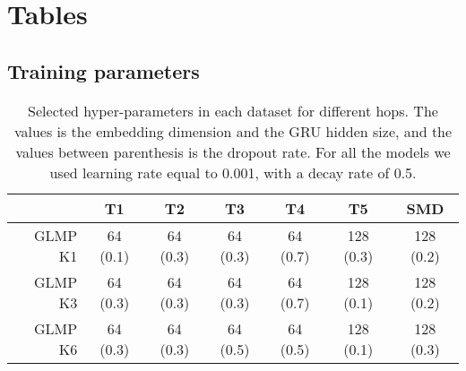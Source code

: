 \documentclass{article} \usepackage{iclr2019_conference,times}
\begin{document}



\newpage
\appendix
\section{Tables}

\subsection{Training parameters}

\begin{table}[h]
\centering
\setlength{\belowcaptionskip}{5pt} 
\caption{Selected hyper-parameters in each dataset for different hops. The values is the embedding dimension and the GRU hidden size, and the values between parenthesis is the dropout rate. For all the models we used learning rate equal to 0.001, with a decay rate of 0.5. }
\begin{tabular}{|r|c|c|c|c|c|c|}
\hline
\multicolumn{1}{|l|}{} & T1 & T2 & T3 & T4 & T5 & SMD \\ \hline
GLMP K1 & 64 (0.1) & 64 (0.3) & 64 (0.3) & 64 (0.7) & 128 (0.3) & 128 (0.2) \\ \hline
GLMP K3 & 64 (0.3) & 64 (0.3) & 64 (0.3) & 64 (0.7) & 128 (0.1) & 128 (0.2) \\ \hline
GLMP K6 & 64 (0.3) & 64 (0.3) & 64 (0.5) & 64 (0.5) & 128 (0.1) & 128 (0.3) \\ \hline
\end{tabular}
\end{table}
\end{document}
